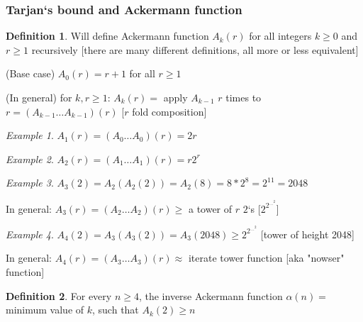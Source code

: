 \documentclass[a4paper,12pt]{article}
\theoremstyle{plain}
\theoremstyle{definition}
\newtheorem*{definition}{Definition}
\theoremstyle{remark}
\newtheorem*{example}{Example}
\begin{document}
\subsubsection{Tarjan`s bound and Ackermann function}

\begin{definition}
Will define Ackermann function $A_k(r)$ for all integers $k \geq 0$ and $r \geq 1$ recursively [there are many different definitions, all more or less equivalent]
\begin{description}
	\item{(Base case)} $A_0(r) = r + 1$ for all $r \geq 1$
	\item{(In general)} for $k, r \geq 1$: $A_k(r) =$ apply $A_{k-1}$ $r$ times to $r = (A_{k-1} \dots A_{k-1})(r)$ [$r$ fold composition]
\end{description}
\end{definition}

\begin{example}
$A_1(r) = (A_0 \dots A_0)(r) = 2r$
\end{example}

\begin{example}
$A_2(r) = (A_1 \dots A_1)(r) = r2^r$
\end{example}

\begin{example}
$A_3(2) = A_2(A_2(2)) = A_2(8) = 8 * 2^8 = 2^{11} = 2048$

In general: $A_3(r) = (A_2 \dots A_2)(r) \geq$ a tower of $r$ $2$`s [$2^{2^{\dots^{2}}}$]
\end{example}

\begin{example}
$A_4(2) = A_3(A_3(2)) = A_3(2048) \geq 2^{2^{\dots^{2}}}$ [tower of height 2048]

In general: $A_4(r) = (A_3 \dots A_3)(r) \approx$ iterate tower function [aka "nowser" function]
\end{example}

\begin{definition}For every $n \geq 4$, the inverse Ackermann function $\alpha(n) =$ minimum value of $k$, such that $A_k(2) \geq n$\end{definition}
\end{document}
